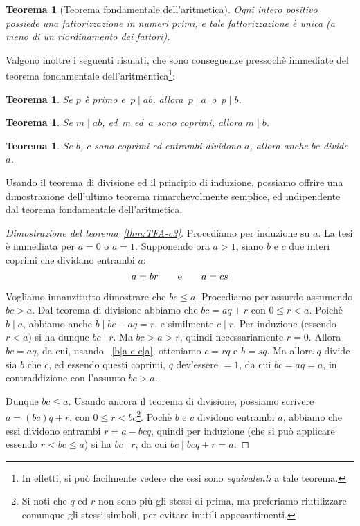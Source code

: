 \documentclass[pdflatex,11pt,a4paper,oneside]{article}
\newcommand{\divides}[0]{\mid}
\newtheorem{theorem}[TheoremLike]{Teorema}
\begin{document}
\begin{theorem}[Teorema fondamentale dell'aritmetica]
Ogni intero positivo possiede una fattorizzazione in numeri primi, e
tale fattorizzazione \`e unica (a meno di un riordinamento dei fattori).
\end{theorem}

Valgono inoltre i seguenti risulati, che sono conseguenze pressoch\`e
immediate del teorema fondamentale dell'aritmentica\footnote{In effetti,
si pu\`o facilmente vedere che essi sono \emph{equivalenti} a tale
teorema.}:

\begin{theorem}\label{thm:TFA-c1}
Se $p$ \`e primo e \,$p \divides ab$, allora \,$p \divides a$\, o
\,$p \divides b$.
\end{theorem}

\begin{theorem}\label{thm:TFA-c2}
Se $m \divides ab$, ed\, $m$ ed\, $a$ sono coprimi, allora $m \divides b$.
\end{theorem}

\begin{theorem}\label{thm:TFA-c3}
Se $b$, $c$ sono coprimi ed entrambi dividono $a$, allora
anche $bc$ divide $a$.
\end{theorem}

\medskip
Usando il teorema di divisione ed il principio di induzione, possiamo
offrire una dimostrazione dell'ultimo teorema rimarchevolmente semplice,
ed indipendente dal teorema fondamentale dell'aritmetica.
%
\begin{proof}[Dimostrazione del teorema~\eqref{thm:TFA-c3}]
%
Procediamo per induzione su $a$.  La tesi \`e immediata per $a = 0$ o
$a = 1$.  Supponendo ora $a > 1$, siano $b$ e $c$ due interi coprimi
che dividano entrambi $a$:%
  \vspace*{-5pt}%
\begin{equation}\label{b|a e c|a}
a = br \qquad\textrm{e}\qquad a = cs
  \vspace*{-5pt}%
\end{equation}

\noindent
Vogliamo innanzitutto dimostrare che $bc \leq a$. Procediamo per assurdo
assumendo $bc > a$.  Dal teorema di divisione abbiamo che $bc = aq + r$
con $0 \leq r < a$.  Poich\`e $b \divides a$, abbiamo anche $b \divides
bc - aq = r$, e similmente $c \divides r$.  Per induzione (essendo
$r < a$) si ha dunque $bc \divides r$. Ma $bc > a > r$, quindi
necessariamente $r = 0$. Allora $bc = aq$, da cui, usando~%
\eqref{b|a e c|a}, otteniamo $c = rq$ e $b = sq$.  Ma allora $q$ divide
sia $b$ che $c$, ed essendo questi coprimi, $q$ dev'essere $= 1$, da
cui $bc = aq = a$, in contraddizione con l'assunto $bc > a$.

Dunque $bc \leq a$. Usando ancora il teorema di divisione, possiamo
scrivere $a = (bc)q + r$, con $0 \leq r < bc$\footnote{Si noti che $q$
ed $r$ non sono pi\`u gli stessi di prima, ma preferiamo riutilizzare
comunque gli stessi simboli, per evitare inutili appesantimenti.}.
Poch\`e $b$ e $c$ dividono entrambi $a$, abbiamo che essi dividono
entrambi $r = a - bcq$, quindi per induzione (che si pu\`o applicare
essendo $r < bc \leq a$) si ha $bc \divides r$, da cui $bc \divides
bcq + r = a$.
\end{proof}
\end{document}
